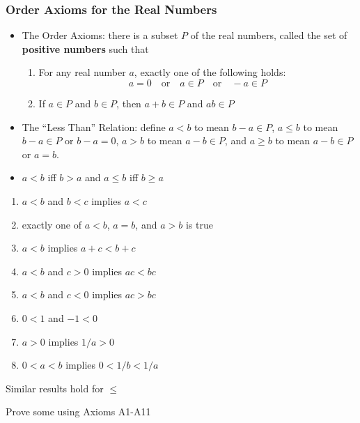 \documentclass[9pt,aspectratio=169]{beamer}
\begin{document}
\begin{frame}[allowframebreaks]
    \frametitle{Order Axioms for the Real Numbers}
    \begin{itemize}
        \item The Order Axioms: there is a subset $P$ of the real numbers,
        called the set of \textbf{positive numbers} such that
        \begin{enumerate}
            \item [A10] For any real number $a$, exactly one of the following
            holds:
            \begin{equation*}
                a = 0 \quad\text{or}\quad a \in P \quad\text{or}\quad -a \in
                P
            \end{equation*}
            \item [A11] If $a \in P$ and $b \in P$, then $a + b \in P$ and
            $ab \in P$
        \end{enumerate}
        \item The ``Less Than'' Relation: define $a < b$ to mean $b - a \in
        P$, $a \leq b$ to mean $b - a \in P$ or $b - a = 0$, $a > b$ to mean
        $a - b \in P$, and $a \geq b$ to mean $a - b \in P$ or $a = b$.
        \item $a < b$ iff $b > a$ and $a \leq b$ iff $b \geq a$
    \end{itemize}
    \framebreak
    \begin{theorem}
        \begin{enumerate}
            \item $a < b$ and $b < c$ implies $a < c$
            \item exactly one of $a < b$, $a = b$, and $a > b$ is true
            \item $a < b$ implies $a + c < b + c$
            \item $a < b$ and $c > 0$ implies $ac < bc$
            \item $a < b$ and $c < 0$ implies $ac > bc$
            \item $0 < 1$ and $-1 < 0$
            \item $a > 0$ implies $1/a > 0$
            \item $0 < a < b$ implies $0 < 1/b < 1/a$
        \end{enumerate}
        Similar results hold for $\leq$
    \end{theorem}
    Prove some using Axioms A1-A11
\end{frame}
\end{document}
